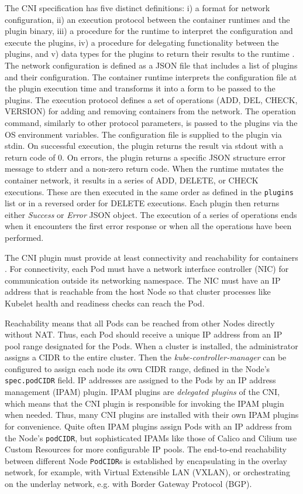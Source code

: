 \documentclass[english, 12pt, a4paper, sci, utf8, a-2b, online]{aaltothesis}
\begin{document}
The CNI specification has five distinct definitions: i) a format for network configuration, ii) an execution protocol between the container runtimes and the plugin binary, iii) a procedure for the runtime to interpret the configuration and execute the plugins, iv) a procedure for delegating functionality between the plugins, and v) data types for the plugins to return their results to the runtime \cite{cni}.
The network configuration is defined as a JSON file that includes a list of plugins and their configuration.
The container runtime interprets the configuration file at the plugin execution time and transforms it into a form to be passed to the plugins.
The execution protocol defines a set of operations (ADD, DEL, CHECK, VERSION) for adding and removing containers from the network.
The operation command, similarly to other protocol parameters, is passed to the plugins via the OS environment variables.
The configuration file is supplied to the plugin via stdin.
On successful execution, the plugin returns the result via stdout with a return code of 0.
On errors, the plugin returns a specific JSON structure error message to stderr and a non-zero return code.
When the runtime mutates the container network, it results in a series of ADD, DELETE, or CHECK executions.
These are then executed in the same order as defined in the \lstinline{plugins} list or in a reversed order for DELETE executions.
Each plugin then returns either \emph{Success} or \emph{Error} JSON object.
The execution of a series of operations ends when it encounters the first error response or when all the operations have been performed.

The CNI plugin must provide at least connectivity and reachability for containers \cite{cni-tkng}.
For connectivity, each Pod must have a network interface controller (NIC) for communication outside its networking namespace.
The NIC must have an IP address that is reachable from the host Node so that cluster processes like Kubelet health and readiness checks can reach the Pod.

Reachability means that all Pods can be reached from other Nodes directly without NAT.
Thus, each Pod should receive a unique IP address from an IP pool range designated for the Pods.
When a cluster is installed, the administrator assigns a CIDR to the entire cluster.
Then the \emph{kube-controller-manager} can be configured to assign each node its own CIDR range, defined in the Node's \lstinline{spec.podCIDR} field.
IP addresses are assigned to the Pods by an IP address management (IPAM) plugin.
IPAM plugins are \emph{delegated plugins} of the CNI, which means that the CNI plugin is responsible for invoking the IPAM plugin when needed.
Thus, many CNI plugins are installed with their own IPAM plugins for convenience.
Quite often IPAM plugins assign Pods with an IP address from the Node's \lstinline{podCIDR}, but sophisticated IPAMs like those of Calico and Cilium use Custom Resources for more configurable IP pools.
The end-to-end reachability between different Node \lstinline{PodCIDR}s is established by encapsulating in the overlay network, for example, with Virtual Extensible LAN (VXLAN), or orchestrating on the underlay network, e.g. with Border Gateway Protocol (BGP).
\end{document}
